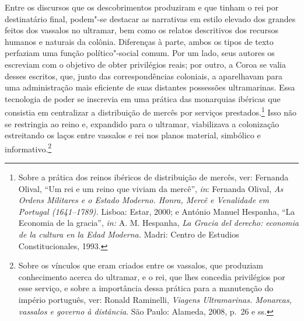Entre os discursos que os descobrimentos produziram e que
tinham o rei por destinatário final, podem"-se destacar as narrativas em
estilo elevado dos grandes feitos dos vassalos no ultramar, bem como os
relatos descritivos dos recursos humanos e
naturais da colônia. Diferenças à parte, ambos os tipos de texto
perfaziam uma função político"-social comum. Por um lado, seus autores
os escreviam com o objetivo de obter privilégios reais; por outro, a
Coroa se valia desses escritos, que, junto das correspondências
coloniais, a aparelhavam para uma administração mais eficiente de suas
distantes possessões ultramarinas. Essa tecnologia de poder se
inscrevia em uma prática das monarquias ibéricas que consistia em
centralizar a distribuição de mercês por serviços prestados.\footnote{
Sobre a prática dos reinos ibéricos de distribuição de mercês, ver:
Fernanda Olival, “Um rei e um reino que viviam da mercê”, \textit{in}:
Fernanda Olival, \textit{As Ordens Militares e o Estado
Moderno. Honra, Mercê e Venalidade em Portugal (1641--1789).} Lisboa:
Estar, 2000; e António Manuel Hespanha, “La Economia de la gracia”,
\textit{in:} A. M. Hespanha, \textit{La Gracia del derecho: economia de
la cultura en la Edad Moderna.} Madri: Centro de Estudios
Constitucionales, 1993.} Isso não se restringia ao reino e, expandido
para o ultramar, viabilizava a colonização estreitando os laços entre
vassalos e rei nos planos material, simbólico e informativo.\footnote{Sobre os vínculos que eram criados entre os vassalos, que produziam conhecimento acerca do ultramar, e o rei, que
lhes concedia privilégios por esse serviço, e sobre a importância dessa prática para a manutenção do império
português, ver: Ronald Raminelli, \textit{Viagens Ultramarinas. Monarcas, vassalos e
governo à distância}. São Paulo: Alameda, 2008, p.~26 e ss.}

